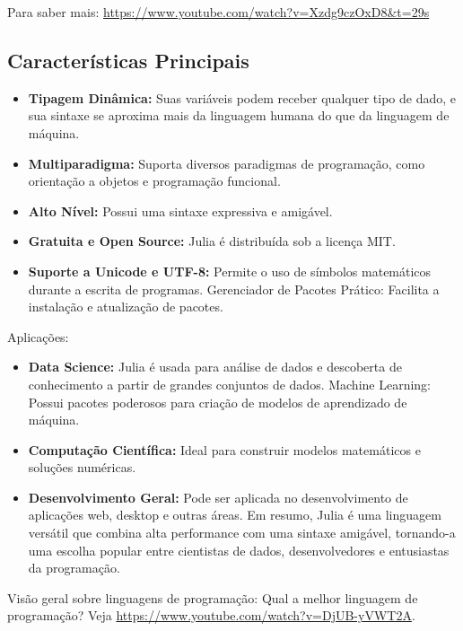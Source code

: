 Para saber mais: \url{https://www.youtube.com/watch?v=Xzdg9czOxD8&t=29s}

\subsection{Características Principais}

\begin{itemize}
\item \textbf{Tipagem Dinâmica:} Suas variáveis podem receber qualquer tipo de dado, e sua sintaxe se aproxima mais da linguagem humana do que da linguagem de máquina.

\item \textbf{Multiparadigma:} Suporta diversos paradigmas de programação, como orientação a objetos e programação funcional.

\item \textbf{Alto Nível:} Possui uma sintaxe expressiva e amigável.

\item \textbf{Gratuita e Open Source:} Julia é distribuída sob a licença MIT.

\item \textbf{Suporte a Unicode e UTF-8:} Permite o uso de símbolos matemáticos durante a escrita de programas. Gerenciador de Pacotes Prático: Facilita a instalação e atualização de pacotes.
\end{itemize}

Aplicações:

\begin{itemize}
\item \textbf{Data Science:} Julia é usada para análise de dados e descoberta de conhecimento a partir de grandes conjuntos de dados. Machine Learning: Possui pacotes poderosos para criação de modelos de aprendizado de máquina.

\item \textbf{Computação Científica:} Ideal para construir modelos matemáticos e soluções numéricas.

\item \textbf{Desenvolvimento Geral:} Pode ser aplicada no desenvolvimento de aplicações web, desktop e outras áreas. Em resumo, Julia é uma linguagem versátil que combina alta performance com uma sintaxe amigável, tornando-a uma escolha popular entre cientistas de dados, desenvolvedores e entusiastas da programação.
\end{itemize}

Visão geral sobre linguagens de programação: Qual a melhor linguagem de programação? Veja \url{https://www.youtube.com/watch?v=DjUB-yVWT2A}.

